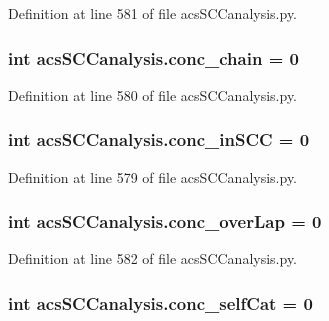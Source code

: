 Definition at line 581 of file acs\-S\-C\-Canalysis.\-py.

\hypertarget{a00102_a3188cc39362e42ecb36d23a98f2b5a78}{
\subsubsection[{conc\-\_\-chain}]{\setlength{\rightskip}{0pt plus 5cm}int acs\-S\-C\-Canalysis.\-conc\-\_\-chain = 0}}\label{a00102_a3188cc39362e42ecb36d23a98f2b5a78}


Definition at line 580 of file acs\-S\-C\-Canalysis.\-py.

\hypertarget{a00102_a3fcb8f9c7e88b5c53f1201a383b38666}{
\subsubsection[{conc\-\_\-in\-S\-C\-C}]{\setlength{\rightskip}{0pt plus 5cm}int acs\-S\-C\-Canalysis.\-conc\-\_\-in\-S\-C\-C = 0}}\label{a00102_a3fcb8f9c7e88b5c53f1201a383b38666}


Definition at line 579 of file acs\-S\-C\-Canalysis.\-py.

\hypertarget{a00102_afd3169174539244248b78c8da2bba265}{
\subsubsection[{conc\-\_\-over\-Lap}]{\setlength{\rightskip}{0pt plus 5cm}int acs\-S\-C\-Canalysis.\-conc\-\_\-over\-Lap = 0}}\label{a00102_afd3169174539244248b78c8da2bba265}


Definition at line 582 of file acs\-S\-C\-Canalysis.\-py.

\hypertarget{a00102_a9e8cc07f7d7f892f3f72274318dcbcef}{
\subsubsection[{conc\-\_\-self\-Cat}]{\setlength{\rightskip}{0pt plus 5cm}int acs\-S\-C\-Canalysis.\-conc\-\_\-self\-Cat = 0}}\label{a00102_a9e8cc07f7d7f892f3f72274318dcbcef}


